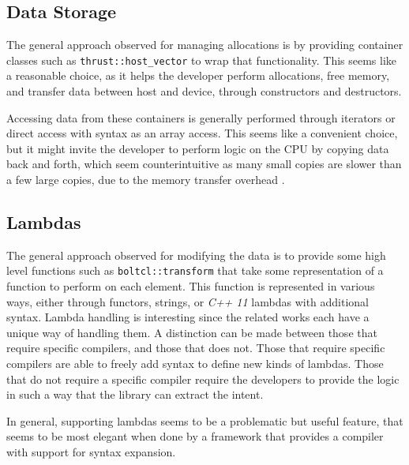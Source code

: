 \subsection{Data Storage}
The general approach observed for managing allocations is by providing container classes such as \texttt{thrust::host\_vector} to wrap that functionality. This seems like a reasonable choice, as it helps the developer perform allocations, free memory, and transfer data between host and device, through constructors and destructors.

Accessing data from these containers is generally performed through iterators or direct access with syntax as an array access. This seems like a convenient choice, but it might invite the developer to perform logic on the CPU by copying data back and forth, which seem counterintuitive as many small copies are slower than a few large copies, due to the memory transfer overhead \cite{memoryTranferOverhead}.

\subsection{Lambdas}
The general approach observed for modifying the data is to provide some high level functions such as \texttt{boltcl::transform} that take some representation of a function to perform on each element. This function is represented in various ways, either through functors, strings, or \textit{C++ 11} lambdas with additional syntax. Lambda handling is interesting since the related works each have a unique way of handling them. A distinction can be made between those that require specific compilers, and those that does not. Those that require specific compilers are able to freely add syntax to define new kinds of lambdas. Those that do not require a specific compiler require the developers to provide the logic in such a way that the library can extract the intent.

In general, supporting lambdas seems to be a problematic but useful feature, that seems to be most elegant when done by a framework that provides a compiler with support for syntax expansion.